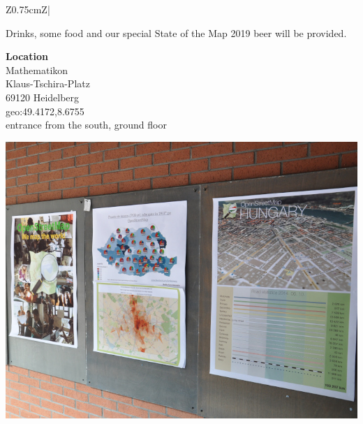 \begin{landscape}
\begin{center}
\begin{tabular}{Z{0.75cm}Z{\socialEventBoxWidth}|}
\begin{minipage}[t]{\socialEventBoxWidth}
\begin{minipage}[c]{0.4\linewidth}
          Drinks, some food and our special State of the Map 2019 beer will be provided.

          \vspace{\socialEventSectionSep}
          \textbf{Location}\\
          Mathematikon\\
          Klaus-Tschira-Platz\\
          69120 Heidelberg\\
          geo:49.4172,8.6755\\
          entrance from the south, ground floor 
          \justifying
        \end{minipage}
        \hfill
        \noindent\begin{minipage}[c]{0.57\linewidth}
          \begin{center}
            \includegraphics[width=0.9\linewidth]{images-print/posters-sotm-eu-2014.jpg}

          \end{center}
        \end{minipage}
      \end{minipage}
      \vspace{0.4\multicolsep}
      \tabularnewline
    \end{tabular}
  \end{center}
\end{landscape}
\renewcommand{\arraystretch}{1.0}
\normalsize
